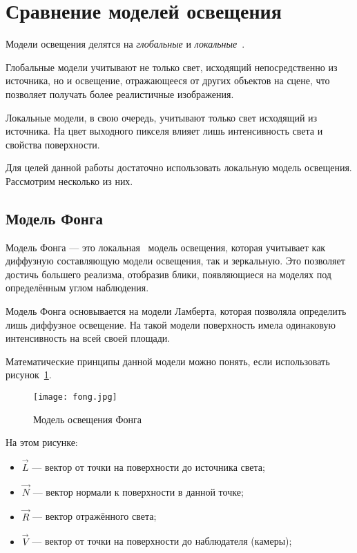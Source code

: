 \section{Сравнение моделей освещения}

Модели освещения делятся на \emph{глобальные} и \emph{локальные}~\cite{CGPaP}.

Глобальные модели учитывают не только свет, исходящий непосредственно из источника, но и освещение, отражающееся от других объектов на сцене, что позволяет получать более реалистичные изображения.

Локальные модели, в свою очередь, учитывают только свет исходящий из источника. На цвет выходного пикселя влияет лишь интенсивность света и свойства поверхности.

Для целей данной работы достаточно использовать локальную модель освещения. Рассмотрим несколько из них.

\subsection{Модель Фонга}

Модель Фонга --- это локальная~\cite{CGPaP} модель освещения, которая учитывает как диффузную составляющую модели освещения, так и зеркальную. Это позволяет достичь большего реализма, отобразив блики, появляющиеся на моделях под определённым углом наблюдения.

Модель Фонга основывается на модели Ламберта, которая позволяла определить лишь диффузное освещение. На такой модели поверхность имела одинаковую интенсивность на всей своей площади.

Математические принципы данной модели можно понять, если использовать рисунок~\ref{fig:fong}.

\begin{figure}[h]
    \centering
    \texttt{[image: fong.jpg]}
    \caption{Модель освещения Фонга}
    \label{fig:fong}
\end{figure}

На этом рисунке:
\begin{itemize}
    \item $\vec{L}$ --- вектор от точки на поверхности до источника света;
    \item $\vec{N}$ --- вектор нормали к поверхности в данной точке; 
    \item $\vec{R}$ --- вектор отражённого света;
    \item $\vec{V}$ --- вектор от точки на поверхности до наблюдателя (камеры);
\end{itemize}

